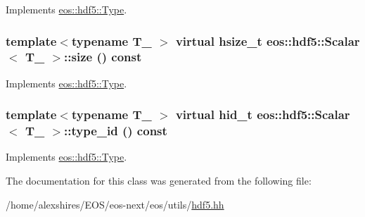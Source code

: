 Implements \hyperlink{structeos_1_1hdf5_1_1Type_a79de1c9f0444de59864107c388c23d2d}{eos::hdf5::Type}.\hypertarget{classeos_1_1hdf5_1_1Scalar_a88e62fcc7557957b737a45a9f6ac7952}{
\subsubsection[{size}]{\setlength{\rightskip}{0pt plus 5cm}template$<$typename T\_\- $>$ virtual hsize\_\-t {\bf eos::hdf5::Scalar}$<$ T\_\- $>$::size () const}}
\label{classeos_1_1hdf5_1_1Scalar_a88e62fcc7557957b737a45a9f6ac7952}


Implements \hyperlink{structeos_1_1hdf5_1_1Type_a0cf79b090412bb228a1df8349acf3c2b}{eos::hdf5::Type}.\hypertarget{classeos_1_1hdf5_1_1Scalar_a5d54b43030237b9bc1c7076184ff968d}{
\subsubsection[{type\_\-id}]{\setlength{\rightskip}{0pt plus 5cm}template$<$typename T\_\- $>$ virtual {\bf hid\_\-t} {\bf eos::hdf5::Scalar}$<$ T\_\- $>$::type\_\-id () const}}
\label{classeos_1_1hdf5_1_1Scalar_a5d54b43030237b9bc1c7076184ff968d}


Implements \hyperlink{structeos_1_1hdf5_1_1Type_a0305c470a7a26a391f9a751e40bb9ff6}{eos::hdf5::Type}.

The documentation for this class was generated from the following file:\begin{DoxyCompactItemize}
\item 
/home/alexshires/EOS/eos-\/next/eos/utils/\hyperlink{hdf5_8hh}{hdf5.hh}\end{DoxyCompactItemize}
